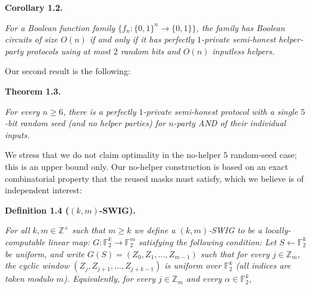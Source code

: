 \documentclass[10pt,a4paper]{article}
\begin{document}
\par\medskip\noindent\textbf{
\textbf{Corollary 1.2}\textbf{.}
}\par



\emph{For a Boolean function family $\{f_{n}:\{0,1\}^{n}\to\{0,1\}\}$, the family has Boolean circuits of size $O(n)$ if and only if it has perfectly $1$-private semi-honest helper-party protocols using at most $2$ random bits and $O(n)$ inputless helpers.}\par






Our second result is the following:\par






\par\medskip\noindent\textbf{
\textbf{Theorem 1.3}\textbf{.}
}\par



\emph{For every $n\geq 6$, there is a perfectly $1$-private semi-honest protocol with a single $5$-bit random seed (and no helper parties) for $n$-party AND of their individual inputs.}\par







We stress that we do not claim optimality in the no-helper $5$ random-seed case; this is an upper bound only.
Our no-helper construction is based on an exact combinatorial property that the reused masks must satisfy, which we believe is of independent interest:\par





\par\medskip\noindent\textbf{
\textbf{Definition 1.4}\textbf{ }($(k,m)$-SWIG)\textbf{.}
}\par



\emph{For all $k,m\in\mathbb{Z}^{+}$ such that $m\geq k$ we define a $(k,m)$-SWIG to be a locally-computable linear map:
$G:\mathbb{F}_{2}^{k}\to\mathbb{F}_{2}^{m}$
satisfying the following condition: Let $S\leftarrow\mathbb{F}_{2}^{k}$ be uniform, and write
$G(S)=(Z_{0},Z_{1},\ldots,Z_{m-1})$
such that for every $j\in\mathbb{Z}_{m}$, the cyclic window
$(Z_{j},Z_{j+1},\ldots,Z_{j+k-1})$
is uniform over $\mathbb{F}_{2}^{k}$ (all indices are taken modulo $m$). Equivalently, for every $j\in\mathbb{Z}_{m}$ and every $\alpha\in\mathbb{F}_{2}^{k}$,}\par
\end{document}
